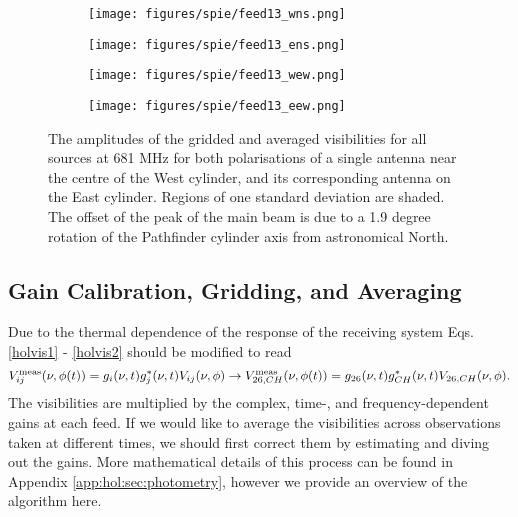 \begin{figure}[h!] %
	\centering
	\begin{subfigure}[b]{0.49\textwidth}%
		\texttt{[image: figures/spie/feed13\_wns.png]}%
	\end{subfigure}%
	\begin{subfigure}[b]{0.47\textwidth}
		\texttt{[image: figures/spie/feed13\_ens.png]}%
	\end{subfigure}
	\begin{subfigure}[b]{0.4925\textwidth}
		\texttt{[image: figures/spie/feed13\_wew.png]}%
	\end{subfigure}
	\begin{subfigure}[b]{0.4675\textwidth}
		\texttt{[image: figures/spie/feed13\_eew.png]}%
	\end{subfigure}
\caption{The amplitudes of the gridded and averaged visibilities for all sources at 681 MHz for both polarisations of a single antenna near the centre of the West cylinder, and its corresponding antenna on the East cylinder. Regions of one standard deviation are shaded. The offset of the peak of the main beam is due to a 1.9 degree rotation of the Pathfinder cylinder axis from astronomical North.}
\vspace{-.1in}
\label{griddeddata}
\end{figure}

\subsection{Gain Calibration, Gridding, and Averaging}
Due to the thermal dependence of the response of the receiving system Eqs. \ref{holvis1} - \ref{holvis2} should be modified to read
\begin{equation}
V^{\rm meas}_{ij}(\nu, \phi(t)) = g_i(\nu, t)g_j^*(\nu, t)V_{ij}(\nu, \phi) \rightarrow V^{\rm meas}_{26,CH}(\nu, \phi(t)) = g_{26}(\nu, t)g_{CH}^*(\nu, t)V_{26,CH}(\nu, \phi).
\label{visgains}
\end{equation}
The visibilities are multiplied by the complex, time-, and frequency-dependent gains at each feed. If we would like to average the visibilities across observations taken at different times, we should first correct them by estimating and diving out the gains. More mathematical details of this process can be found in Appendix \ref{app:hol:sec:photometry}, however we provide an overview of the algorithm here.

